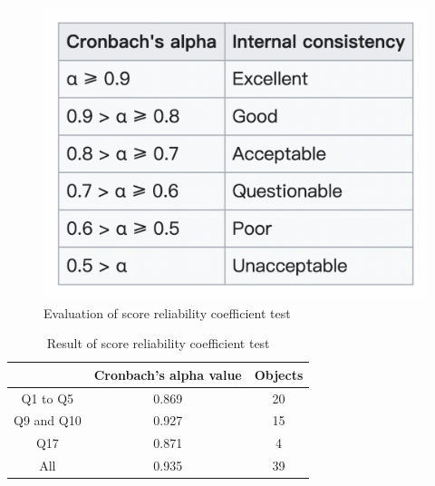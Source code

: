 \begin{figure}[h]
  \includegraphics[width=0.5\linewidth]{Figure/Figure24.jpg}
  \centering
  \caption{Evaluation of score reliability coefficient test}
  \label{fig24}
\end{figure}


\begin{table}[h]
  \caption{Result of score reliability coefficient test}
  \label{table8}
  \centering
  \begin{tabular}{|c|c|c|}
  \hline
          & Cronbach's alpha value & Objects \\
 \hline 
  Q1 to Q5 & 0.869 & 20 \\
 \hline
  Q9 and Q10 & 0.927 & 15 \\
 \hline 
  Q17 & 0.871 & 4 \\
 \hline
  All & 0.935 & 39 \\
 \hline
  \end{tabular}
\end{table}
\fi

